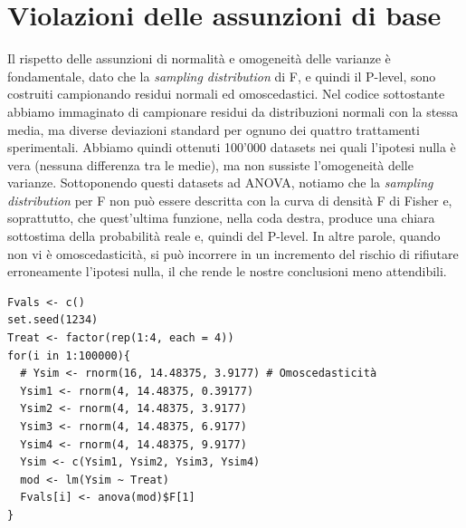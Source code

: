 \documentclass[a4paper,12pt,oneside]{book}
\begin{document}
\hypertarget{violazioni-delle-assunzioni-di-base}{%
\section{Violazioni delle assunzioni di base}\label{violazioni-delle-assunzioni-di-base}}

Il rispetto delle assunzioni di normalità e omogeneità delle varianze è fondamentale, dato che la \emph{sampling distribution} di F, e quindi il P-level, sono costruiti campionando residui normali ed omoscedastici. Nel codice sottostante abbiamo immaginato di campionare residui da distribuzioni normali con la stessa media, ma diverse deviazioni standard per ognuno dei quattro trattamenti sperimentali. Abbiamo quindi ottenuti 100'000 datasets nei quali l'ipotesi nulla è vera (nessuna differenza tra le medie), ma non sussiste l'omogeneità delle varianze. Sottoponendo questi datasets ad ANOVA, notiamo che la \emph{sampling distribution} per F non può essere descritta con la curva di densità F di Fisher e, soprattutto, che quest'ultima funzione, nella coda destra, produce una chiara sottostima della probabilità reale e, quindi del P-level. In altre parole, quando non vi è omoscedasticità, si può incorrere in un incremento del rischio di rifiutare erroneamente l'ipotesi nulla, il che rende le nostre conclusioni meno attendibili.

\begin{verbatim}
Fvals <- c()
set.seed(1234)
Treat <- factor(rep(1:4, each = 4))
for(i in 1:100000){
  # Ysim <- rnorm(16, 14.48375, 3.9177) # Omoscedasticità
  Ysim1 <- rnorm(4, 14.48375, 0.39177)
  Ysim2 <- rnorm(4, 14.48375, 3.9177)
  Ysim3 <- rnorm(4, 14.48375, 6.9177)
  Ysim4 <- rnorm(4, 14.48375, 9.9177)
  Ysim <- c(Ysim1, Ysim2, Ysim3, Ysim4)
  mod <- lm(Ysim ~ Treat)
  Fvals[i] <- anova(mod)$F[1]
}
\end{verbatim}
\end{document}
